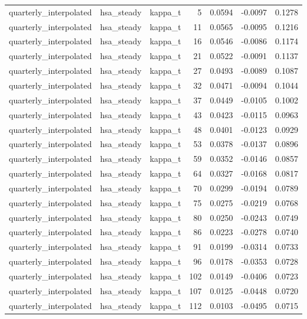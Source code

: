 \begin{tabular}{lllrrrr}
quarterly\_interpolated & hsa\_steady & kappa\_t & 5 & 0.0594 & -0.0097 & 0.1278 \\
quarterly\_interpolated & hsa\_steady & kappa\_t & 11 & 0.0565 & -0.0095 & 0.1216 \\
quarterly\_interpolated & hsa\_steady & kappa\_t & 16 & 0.0546 & -0.0086 & 0.1174 \\
quarterly\_interpolated & hsa\_steady & kappa\_t & 21 & 0.0522 & -0.0091 & 0.1137 \\
quarterly\_interpolated & hsa\_steady & kappa\_t & 27 & 0.0493 & -0.0089 & 0.1087 \\
quarterly\_interpolated & hsa\_steady & kappa\_t & 32 & 0.0471 & -0.0094 & 0.1044 \\
quarterly\_interpolated & hsa\_steady & kappa\_t & 37 & 0.0449 & -0.0105 & 0.1002 \\
quarterly\_interpolated & hsa\_steady & kappa\_t & 43 & 0.0423 & -0.0115 & 0.0963 \\
quarterly\_interpolated & hsa\_steady & kappa\_t & 48 & 0.0401 & -0.0123 & 0.0929 \\
quarterly\_interpolated & hsa\_steady & kappa\_t & 53 & 0.0378 & -0.0137 & 0.0896 \\
quarterly\_interpolated & hsa\_steady & kappa\_t & 59 & 0.0352 & -0.0146 & 0.0857 \\
quarterly\_interpolated & hsa\_steady & kappa\_t & 64 & 0.0327 & -0.0168 & 0.0817 \\
quarterly\_interpolated & hsa\_steady & kappa\_t & 70 & 0.0299 & -0.0194 & 0.0789 \\
quarterly\_interpolated & hsa\_steady & kappa\_t & 75 & 0.0275 & -0.0219 & 0.0768 \\
quarterly\_interpolated & hsa\_steady & kappa\_t & 80 & 0.0250 & -0.0243 & 0.0749 \\
quarterly\_interpolated & hsa\_steady & kappa\_t & 86 & 0.0223 & -0.0278 & 0.0740 \\
quarterly\_interpolated & hsa\_steady & kappa\_t & 91 & 0.0199 & -0.0314 & 0.0733 \\
quarterly\_interpolated & hsa\_steady & kappa\_t & 96 & 0.0178 & -0.0353 & 0.0728 \\
quarterly\_interpolated & hsa\_steady & kappa\_t & 102 & 0.0149 & -0.0406 & 0.0723 \\
quarterly\_interpolated & hsa\_steady & kappa\_t & 107 & 0.0125 & -0.0448 & 0.0720 \\
quarterly\_interpolated & hsa\_steady & kappa\_t & 112 & 0.0103 & -0.0495 & 0.0715 \\

\end{tabular}
